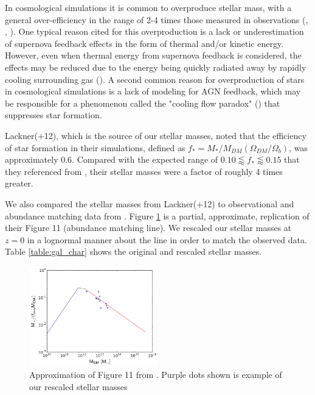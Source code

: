 \documentclass[english, apj]{emulateapj}
\begin{document}
In cosmological simulations it is common to overproduce stellar mass, with a general over-efficiency in the range of 2-4 times those measured in observations (\citet{1996ApJS..105...19K}, \citet{2010MNRAS.404.1111G}, \citet{2010ApJ...725.2312O}).  One typical reason cited for this overproduction is a lack or underestimation of supernova feedback effects in the form of thermal and/or kinetic energy.  However, even when thermal energy from supernova feedback is considered, the effects may be reduced due to the energy being quickly radiated away by rapidly cooling surrounding gas (\citet{1996ApJS..105...19K}).  A second common reason for overproduction of stars in cosmological simulations is a lack of modeling for AGN feedback, which may be responsible for a phenomenon called the "cooling flow paradox" (\citet{2001MNRAS.321L..20F}) that suppresses star formation. 

Lackner(+12), which is the source of our stellar masses, noted that the efficiency of star formation in their simulations, defined as $f_*=M_*/M_{DM}(\Omega_{DM}/\Omega_b)$, was approximately 0.6.  Compared with the expected range of $0.10 \lessapprox f_* \lessapprox 0.15$ that they referenced from \citet{2012ApJ...746...95L}, their stellar masses were a factor of roughly 4 times greater.

We also compared the stellar masses from Lackner\-(+12) to  observational and abundance matching data from \citet{2018AstL...44....8K}. Figure \ref{fig:stellar1} is a partial, approximate, replication of their Figure 11 (abundance matching line).  We rescaled our stellar masses at $z=0$ in a lognormal manner about the line in order to match the observed data.  Table \ref{table:gal_char} shows the original and rescaled stellar masses.

\begin{figure}[htbp]
\begin{center}
\includegraphics[width=0.5\textwidth]{plots/stellar_to_halo_ratio.png}
\caption{Approximation of Figure 11 from \citet{2018AstL...44....8K}.  Purple dots shown is example of our rescaled stellar masses}
\label{fig:stellar1}
\end{center}
\end{figure}
\end{document}
